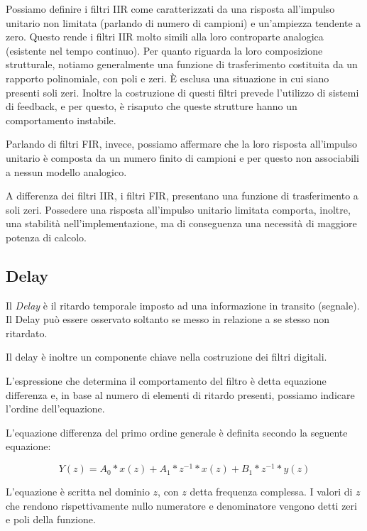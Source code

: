 Possiamo definire i filtri IIR come caratterizzati da una risposta all’impulso
unitario non limitata (parlando di numero di campioni) e un’ampiezza tendente
a zero. Questo rende i filtri IIR molto simili alla loro controparte analogica
(esistente nel tempo continuo). Per quanto riguarda la loro composizione
strutturale, notiamo generalmente una funzione di trasferimento costituita da
un rapporto polinomiale, con poli e zeri. È esclusa una situazione in cui siano
presenti soli zeri. Inoltre la costruzione di questi filtri prevede l’utilizzo
di sistemi di feedback, e per questo, è risaputo che queste strutture hanno un
comportamento instabile.

Parlando di filtri FIR, invece, possiamo affermare che la loro risposta
all’impulso unitario è composta da un numero finito di campioni e per questo
non associabili a nessun modello analogico.

A differenza dei filtri IIR, i filtri FIR, presentano una funzione di
trasferimento a soli zeri. Possedere una risposta all’impulso unitario limitata
comporta, inoltre, una stabilità nell'implementazione, ma di conseguenza una
necessità di maggiore potenza di calcolo.


\subsection{Delay}

Il \emph{Delay} è il ritardo temporale imposto ad una informazione in transito
(segnale). Il Delay può essere osservato soltanto se messo in relazione a se
stesso non ritardato.

Il delay è inoltre un componente chiave nella costruzione dei filtri digitali.

L’espressione che determina il comportamento del filtro è detta equazione
differenza e, in base al numero di elementi di ritardo presenti, possiamo
indicare l’ordine dell’equazione.

L’equazione differenza del primo ordine generale è definita secondo la seguente
equazione:

\begin{equation}
Y(z)=A_0*x(z) + A_1*z^{-1}*x(z) + B_1*z^{-1}*y(z)
\end{equation}

L’equazione è scritta nel dominio $z$, con $z$ detta frequenza complessa.
I valori di $z$ che rendono rispettivamente nullo numeratore e denominatore
vengono detti zeri e poli della funzione.


